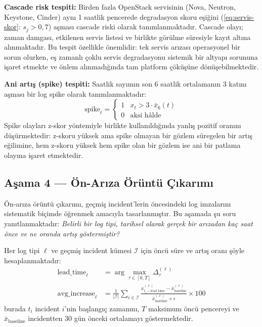\textbf{Cascade risk tespiti:} Birden fazla OpenStack servisinin (Nova, Neutron, Keystone, Cinder) aynı 1 saatlik pencerede degradasyon skoru eşiğini (\autoref{eq:servis-skor}: $s_j > 0{,}7$) aşması cascade riski olarak tanımlanmaktadır.
Cascade olayı; zaman damgası, etkilenen servis listesi ve birlikte görülme süresiyle kayıt altına alınmaktadır.
Bu tespit özellikle önemlidir: tek servis arızası operasyonel bir sorun olurken, eş zamanlı çoklu servis degradasyonu sistemik bir altyapı sorununa işaret etmekte ve önlem alınmadığında tam platform çöküşüne dönüşebilmektedir.

\textbf{Ani artış (spike) tespiti:} Saatlik sayımın son 6 saatlik ortalamanın 3 katını aşması bir log spike olarak tanımlanmaktadır:
\begin{equation}
    \text{spike}_t = \begin{cases} 1 & x_t > 3 \cdot \bar{x}_{6}(t) \\ 0 & \text{aksi hâlde} \end{cases}
    \label{eq:spike}
\end{equation}
Spike olayları z-skor yöntemiyle birlikte kullanıldığında yanlış pozitif oranını düşürmektedir: z-skoru yüksek ama spike olmayan bir gözlem süregelen bir artış eğilimine, hem z-skoru yüksek hem spike olan bir gözlem ise ani bir patlama olayına işaret etmektedir.

\subsection{Aşama 4 — Ön-Arıza Örüntü Çıkarımı}

Ön-arıza örüntü çıkarımı, geçmiş incident'lerin öncesindeki log imzalarını sistematik biçimde öğrenmek amacıyla tasarlanmıştır.
Bu aşamada şu soru yanıtlanmaktadır: \textit{Belirli bir log tipi, tarihsel olarak gerçek bir arızadan kaç saat önce ve ne oranda artış göstermiştir?}

Her log tipi $\ell$ ve geçmiş incident kümesi $\mathcal{I}$ için öncü süre ve artış oranı şöyle hesaplanmaktadır:
\begin{align}
    \text{lead\_time}_\ell &= \arg\max_{\tau \in [0, T]} \Delta_{\tau}^{(\ell)} \label{eq:leadtime} \\
    \text{avg\_increase}_\ell &= \frac{1}{|\mathcal{I}|} \sum_{i \in \mathcal{I}} \frac{x_{t_i - \text{lead\_time}}^{(\ell)} - \bar{x}_{\text{baseline}}^{(\ell)}}{\bar{x}_{\text{baseline}}^{(\ell)} + \epsilon} \times 100
    \label{eq:avgincr}
\end{align}
burada $t_i$ incident $i$'nin başlangıç zamanını, $T$ maksimum öncü pencereyi ve $\bar{x}_{\text{baseline}}$ incidentten 30 gün önceki ortalamayı göstermektedir.

